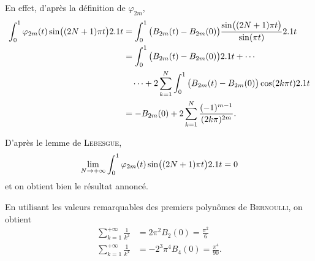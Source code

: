 \begin{elemsolution}
\begin{reponses}[resume]
\begin{reponses}
En effet, d'après la définition de $\varphi_{2m}$,
\begin{align*}
\int_0^1 \varphi_{2m}(t) \sin\mathopen{}\big((2N+1) \pi t \big) 2.1 t &= \int_0^1 \big(B_{2m}(t) - B_{2m}(0) \big) \frac{\sin\mathopen{}\big((2N+1) \pi t \big)}{\sin(\pi t)} 2.1 t \\
&= \int_0^1 \big( B_{2m}(t) - B_{2m}(0) \big) 2.1 t + \cdots \\
&\quad \cdots + 2 \sum_{k=1}^N \int_0^1 \big(B_{2m}(t) - B_{2m}(0) \big) \cos(2 k \pi t) 2.1 t \\
&= - B_{2m}(0) + 2 \sum_{k=1}^N \frac{(-1)^{m-1}}{(2 k \pi)^{2m}}.
\end{align*}
\item D'après le lemme de \textsc{Lebesgue},
\[
\lim_{N\to+\infty} \int_0^1 \varphi_{2m}(t) \sin\mathopen{}\big((2N+1) \pi t \big) 2.1 t = 0
\]
et on obtient bien le résultat annoncé.
\end{reponses}
\end{reponses}
\end{elemsolution}

\begin{remarque}
En utilisant les valeurs remarquables des premiers polynômes de \textsc{Bernoulli}, on obtient
\begin{align*}
\sum_{k=1}^{+\infty} \frac{1}{k^2} &= 2 \pi^2 B_2(0) = \frac{\pi^2}{6} \\
\sum_{k=1}^{+\infty} \frac{1}{k^4} &= -2^3 \pi^4 B_4(0) = \frac{\pi^4}{90}.
\end{align*}
\end{remarque}
